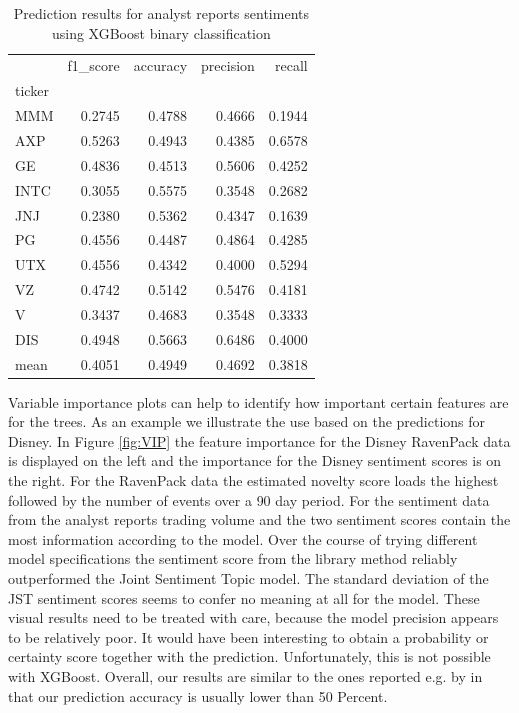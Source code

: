 \begin{table}[h]
\centering
\begin{tabular}{lrrrr}
\toprule
{} &  f1\_score &  accuracy &  precision &    recall \\
ticker &           &           &            &           \\
\midrule
MMM    &  0.2745 &  0.4788 &   0.4666 &  0.1944 \\
AXP    &  0.5263 &  0.4943 &   0.4385 &  0.6578 \\
GE     &  0.4836 &  0.4513 &   0.5606 &  0.4252 \\
INTC   &  0.3055 &  0.5575 &   0.3548 &  0.2682 \\
JNJ    &  0.2380 &  0.5362 &   0.4347 &  0.1639 \\
PG     &  0.4556 &  0.4487 &   0.4864 &  0.4285 \\
UTX    &  0.4556 &  0.4342 &   0.4000 &  0.5294 \\
VZ     &  0.4742 &  0.5142 &   0.5476 &  0.4181 \\
V      &  0.3437 &  0.4683 &   0.3548 &  0.3333 \\
DIS    &  0.4948 &  0.5663 &   0.6486 &  0.4000 \\
\midrule
mean &  0.4051 & 0.4949 & 0.4692 & 0.3818 \\
\bottomrule
\end{tabular}
    \caption{Prediction results for analyst reports sentiments using XGBoost binary classification}
    \label{tab:OurSentRes}
\end{table}
Variable importance plots can help to identify how important certain features are for the trees. As an example we illustrate the use based on the predictions for Disney. In Figure \ref{fig:VIP} the feature importance for the Disney RavenPack data is displayed on the left and the importance for the Disney sentiment scores is on the right. For the RavenPack data the estimated novelty score loads the highest followed by the number of events over a 90 day period. For the sentiment data from the analyst reports trading volume and the two sentiment scores contain the most information according to the model. Over the course of trying different model specifications the sentiment score from the library method reliably outperformed the Joint Sentiment Topic model. The standard deviation of the JST sentiment scores seems to confer no meaning at all for the model. These visual results need to be treated with care, because the model precision appears to be relatively poor. It would have been interesting to obtain a probability or certainty score together with the prediction. Unfortunately, this is not possible with XGBoost. Overall, our results are similar to the ones reported e.g. by \citet{atkins2018financial} in that our prediction accuracy is usually lower than 50 Percent. 

